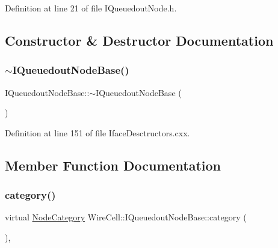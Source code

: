 Definition at line 21 of file I\+Queuedout\+Node.\+h.



\subsection{Constructor \& Destructor Documentation}
\mbox{\label{class_wire_cell_1_1_i_queuedout_node_base_a44f8bacbe74f77b87445765f29b80ec1}} 
\subsubsection{\texorpdfstring{$\sim$\+I\+Queuedout\+Node\+Base()}{~IQueuedoutNodeBase()}}
{\footnotesize\ttfamily I\+Queuedout\+Node\+Base\+::$\sim$\+I\+Queuedout\+Node\+Base (\begin{DoxyParamCaption}{ }\end{DoxyParamCaption})\hspace{0.3cm}{\ttfamily [virtual]}}



Definition at line 151 of file Iface\+Desctructors.\+cxx.



\subsection{Member Function Documentation}
\mbox{\label{class_wire_cell_1_1_i_queuedout_node_base_a45a6b7c8c0af34108868b9b4a0f2a8cf}} 
\subsubsection{\texorpdfstring{category()}{category()}}
{\footnotesize\ttfamily virtual \hyperlink{class_wire_cell_1_1_i_node_a5546e64cbb70bd3ac787295cac9ac803}{Node\+Category} Wire\+Cell\+::\+I\+Queuedout\+Node\+Base\+::category (\begin{DoxyParamCaption}{ }\end{DoxyParamCaption})\hspace{0.3cm}{\ttfamily [inline]}, {\ttfamily [virtual]}}



